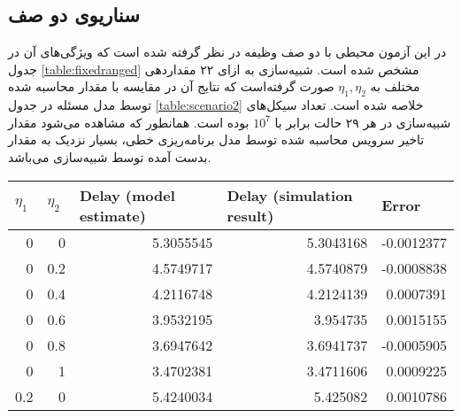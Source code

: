 \subsection{سناریوی دو صف}
در این آزمون محیطی با دو صف وظیفه در نظر گرفته شده است که ویژگی‌های آن در جدول \ref{table:fixedranged} مشخص شده است. شبیه‌سازی به ازای ۲۲ مقداردهی مختلف به $\eta_1, \eta_2$ صورت گرفته‌است که نتایج آن در مقایسه با مقدار محاسبه شده توسط مدل مسئله در جدول \ref{table:scenario2} خلاصه شده است. تعداد سیکل‌های شبیه‌سازی در هر ۲۹ حالت برابر با $10^7$ بوده است. همانطور که مشاهده می‌شود مقدار تاخیر سرویس محاسبه شده توسط مدل برنامه‌ریزی خطی، بسیار نزدیک به مقدار بدست آمده توسط شبیه‌سازی می‌باشد.
\begin{table}[]
	\centering
	\begin{latin}
		\begin{tabular}{@{}rrrrr@{}}
			\toprule
			\multicolumn{1}{l}{$\eta_1$} & \multicolumn{1}{l}{$\eta_2$} & \multicolumn{1}{l}{Delay (model estimate)} & \multicolumn{1}{l}{Delay (simulation result)} & \multicolumn{1}{l}{Error} \\ \midrule
			0                        & 0                        & 5.3055545                                  & 5.3043168                                     & -0.0012377                \\
			0                        & 0.2                      & 4.5749717                                  & 4.5740879                                     & -0.0008838                \\
			0                        & 0.4                      & 4.2116748                                  & 4.2124139                                     & 0.0007391                 \\
			0                        & 0.6                      & 3.9532195                                  & 3.954735                                      & 0.0015155                 \\
			0                        & 0.8                      & 3.6947642                                  & 3.6941737                                     & -0.0005905                \\
			0                        & 1                        & 3.4702381                                  & 3.4711606                                     & 0.0009225                 \\
			0.2                      & 0                        & 5.4240034                                  & 5.425082                                      & 0.0010786                 \\

\end{tabular}
\end{latin}
\end{table}
